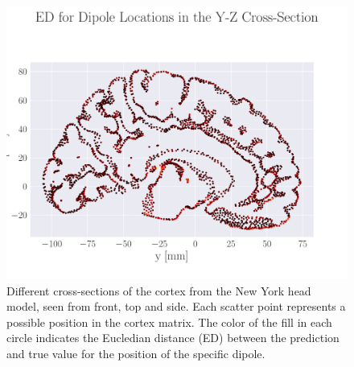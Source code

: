 \documentclass[a4paper, UKenglish, 11pt]{uiomaster}
\begin{document}
\begin{figure}[!htb]
    \vspace{10pt} %
    \includegraphics[width=0.7\linewidth]{figures/simple/MED_simple_dipole_error_Euclidean Distance_2.pdf}
    \caption{Different cross-sections of the cortex from the New York head model, seen from front, top and side. Each scatter point represents a possible position in the cortex matrix. The color of the fill in each circle indicates the Eucledian distance (ED) between the prediction and true value for the position of the specific dipole.}
    \label{fig:MED_crossections}
\end{figure}
\end{document}

